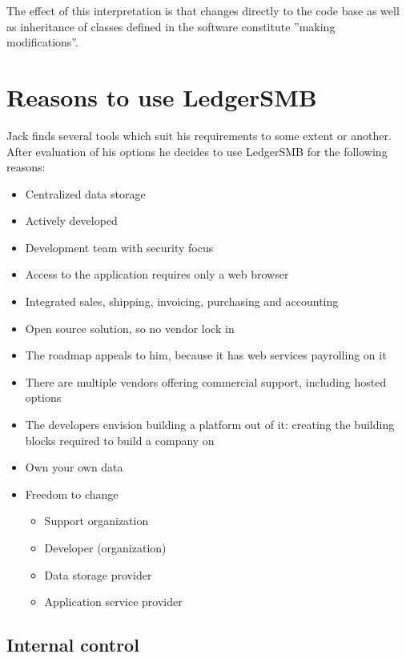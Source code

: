 The effect of this interpretation is that changes directly to the code base as
well as inheritance of classes defined in the software constitute ''making modifications''.

\chapter{Reasons to use LedgerSMB}
\label{cha-advocacy}

Jack finds several tools which suit his requirements to some extent or another.
After evaluation of his options he decides to use LedgerSMB for the following reasons:

\begin{itemize}
\item Centralized data storage
\item Actively developed
\item Development team with security focus
\item Access to the application requires only a web browser
\item Integrated sales, shipping, invoicing, purchasing and accounting
\item Open source solution, so no vendor lock in
\item The roadmap appeals to him, because it has web services payrolling on it
\item There are multiple vendors offering commercial support, including hosted options
\item The developers envision building a platform out of it: creating the building blocks
required to build a company on
\end{itemize}


\begin{itemize}
\item Own your own data
\item Freedom to change
        \begin{itemize}
        \item Support organization
        \item Developer (organization)
        \item Data storage provider
        \item Application service provider
        \end{itemize}
\end{itemize}

\section{Internal control}
\label{sec-advocacy-internal-control}

